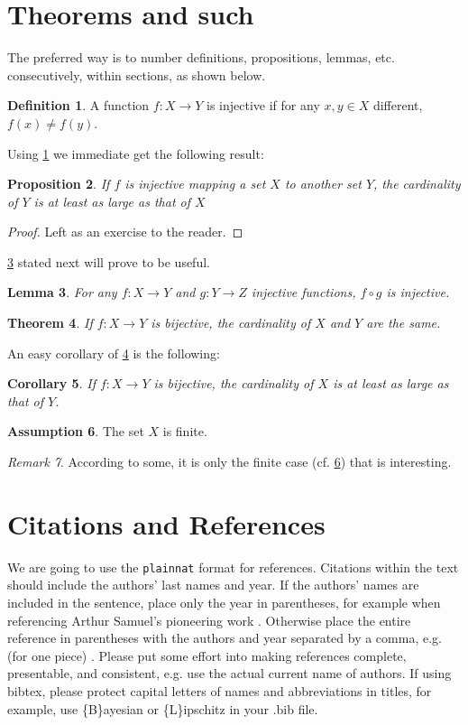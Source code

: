 \documentclass{article}
\theoremstyle{plain}
\newtheorem{theorem}{Theorem}[section]
\newtheorem{proposition}[theorem]{Proposition}
\newtheorem{lemma}[theorem]{Lemma}
\newtheorem{corollary}[theorem]{Corollary}
\theoremstyle{definition}
\newtheorem{definition}[theorem]{Definition}
\newtheorem{assumption}[theorem]{Assumption}
\theoremstyle{remark}
\newtheorem{remark}[theorem]{Remark}
\begin{document}
\section{Theorems and such}
The preferred way is to number definitions, propositions, lemmas, etc. consecutively, within sections, as shown below.
\begin{definition}
\label{def:inj}
A function $f:X \to Y$ is injective if for any $x,y\in X$ different, $f(x)\ne f(y)$.
\end{definition}
Using \cref{def:inj} we immediate get the following result:
\begin{proposition}
If $f$ is injective mapping a set $X$ to another set $Y$, 
the cardinality of $Y$ is at least as large as that of $X$
\end{proposition}
\begin{proof} 
Left as an exercise to the reader. 
\end{proof}
\cref{lem:usefullemma} stated next will prove to be useful.
\begin{lemma}
\label{lem:usefullemma}
For any $f:X \to Y$ and $g:Y\to Z$ injective functions, $f \circ g$ is injective.
\end{lemma}
\begin{theorem}
\label{thm:bigtheorem}
If $f:X\to Y$ is bijective, the cardinality of $X$ and $Y$ are the same.
\end{theorem}
An easy corollary of \cref{thm:bigtheorem} is the following:
\begin{corollary}
If $f:X\to Y$ is bijective, 
the cardinality of $X$ is at least as large as that of $Y$.
\end{corollary}
\begin{assumption}
The set $X$ is finite.
\label{ass:xfinite}
\end{assumption}
\begin{remark}
According to some, it is only the finite case (cf. \cref{ass:xfinite}) that is interesting.
\end{remark}

\section{Citations and References}

We are going to use the \texttt{plainnat} format for references.
Citations within the text should include the authors' last names and
year. If the authors' names are included in the sentence, place only
the year in parentheses, for example when referencing Arthur Samuel's
pioneering work . Otherwise place the entire
reference in parentheses with the authors and year separated by a
comma, e.g. (for one piece) \cite{lee2023talkin}.  
Please put some effort into making references complete, presentable, and
consistent, e.g. use the actual current name of authors.
If using bibtex, please protect capital letters of names and
abbreviations in titles, for example, use \{B\}ayesian or \{L\}ipschitz
in your .bib file.
\end{document}
